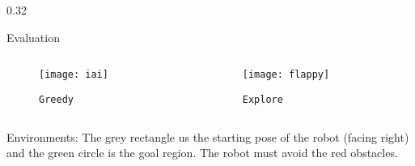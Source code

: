 \begin{columns}[t]
\begin{column} {0.32\textwidth}
\begin{block}{\large Evaluation}
			\begin{columns}
				\centering
				\begin{column}{0.4\columnwidth} 
					\centering
					\begin{figure}
					\texttt{[image: iai]}
					\caption{\texttt{Greedy}} 
					\end{figure}
				\end{column}
				\hfill
				\begin{column}{0.4\columnwidth} 
					\centering
					\begin{figure}
					\texttt{[image: flappy]}
					\caption{\texttt{Explore}} 
					\end{figure}
				\end{column}
			\end{columns}
			\vspace{0.2in}
			Environments: The grey rectangle us the starting pose of the robot (facing right) and the green circle is the goal region. The robot must avoid the red obstacles.
			\vspace{0.1in}
		\end{block}
	\end{column}
\end{columns}



